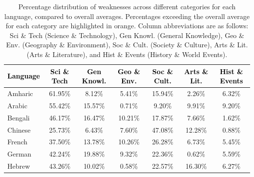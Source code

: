 \begin{table}[t]
\centering
\small
\renewcommand{\arraystretch}{1.2}
\setlength{\tabcolsep}{3pt}
\caption{Percentage distribution of weaknesses across different categories for each language, compared to overall averages. Percentages exceeding the overall average for each category are highlighted in \textcolor{highlightorange}{orange}.  Column abbreviations are as follows: Sci \& Tech (Science \& Technology), Gen Knowl. (General Knowledge), Geo \& Env. (Geography \& Environment), Soc \& Cult. (Society \& Culture), Arts \& Lit. (Arts \& Literature), and Hist \& Events (History \& World Events).}
\label{tab:category}
\begin{tabular}{lcccccc}
    \toprule[1.5pt]
    \rowcolor{headerbg}
    \textcolor{black}{\textbf{Language}} &
    \textcolor{black}{\textbf{Sci \& Tech}} &
    \textcolor{black}{\textbf{Gen Knowl.}} &
    \textcolor{black}{\textbf{Geo \& Env.}} &
    \textcolor{black}{\textbf{Soc \& Cult.}} &
    \textcolor{black}{\textbf{Arts \& Lit.}} &
    \textcolor{black}{\textbf{Hist \& Events}} \\
    \midrule[0.8pt]
    \midrule[0.8pt]
    Amharic   & \textcolor{highlightorange}{61.95\%} & 8.12\%   & 5.41\%   & 15.94\% & 2.26\%   & \textcolor{highlightorange}{6.32\%}   \\
    Arabic    & \textcolor{highlightorange}{55.42\%} & \textcolor{highlightorange}{15.57\%} & 0.71\%   & 9.20\%     & \textcolor{highlightorange}{9.91\%}   & \textcolor{highlightorange}{9.20\%}     \\
    Bengali   & \textcolor{highlightorange}{46.17\%} & \textcolor{highlightorange}{16.47\%} & \textcolor{highlightorange}{10.21\%} & 17.87\% & \textcolor{highlightorange}{7.66\%}   & 1.62\%   \\
    Chinese   & 25.73\% & 6.43\%   & \textcolor{highlightorange}{7.60\%}    & \textcolor{highlightorange}{47.08\%} & \textcolor{highlightorange}{12.28\%} & 0.88\%   \\
    French    & 37.50\%   & \textcolor{highlightorange}{13.78\%} & \textcolor{highlightorange}{10.26\%} & \textcolor{highlightorange}{26.28\%} & 6.73\%   & \textcolor{highlightorange}{5.45\%}   \\
    German    & 42.24\% & \textcolor{highlightorange}{19.88\%} & \textcolor{highlightorange}{9.32\%}   & 22.36\% & 0.62\%   & \textcolor{highlightorange}{5.59\%}   \\
    Hebrew    & 43.26\% & 10.02\%   & 0.58\%       & 22.57\% & \textcolor{highlightorange}{16.30\%}   & \textcolor{highlightorange}{6.27\%}   \\

\end{tabular}
\end{table}
